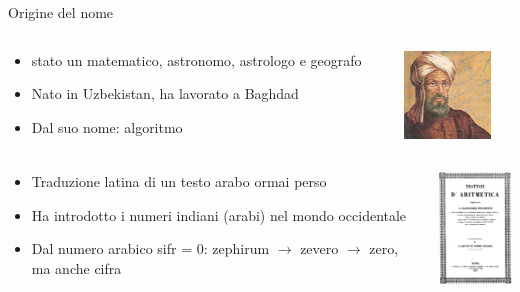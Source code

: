 \begin{frame}[shrink=5]{Origine del nome}
	
\vspace{-12pt}
\begin{columns}[T]
\begin{column}{0.80\textwidth}	
\begin{myboxtitle}
\medskip
\begin{itemize}
\item \EE stato un matematico, astronomo, astrologo e geografo 
\item Nato in Uzbekistan, ha lavorato a Baghdad
\item Dal suo nome: \alert{algoritmo}
\end{itemize}
\end{myboxtitle}
\end{column}
\begin{column}{0.18\textwidth}	
\begin{center}
\includegraphics[width=2.3cm]{alkhavarizmi.jpg}
\end{center}
\end{column}
\end{columns}


\begin{overprint}

\begin{columns}[T]

\begin{myboxtitle}
\begin{itemize}
\item Traduzione latina di un testo arabo ormai perso
\item Ha introdotto i numeri indiani (arabi) nel mondo occidentale
\item Dal numero arabico \alert{sifr} = 0: zephirum $\rightarrow$ zevero $\rightarrow$ zero, ma anche cifra
\end{itemize}
\end{myboxtitle}

\begin{center}
\includegraphics[width=2.3cm]{indorum.jpg}
\end{center}
\end{columns}


\end{overprint}
\end{frame}
